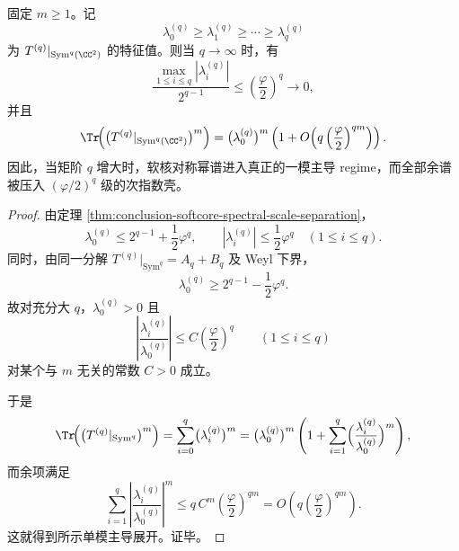 \begin{theorem}[高矩阶软核的单模主导与指数型余谱压缩]\label{thm:conclusion-softcore-highq-one-mode-dominance}
固定 \(m\ge 1\)。记
\[
\lambda_0^{(q)}\ge \lambda_1^{(q)}\ge \cdots \ge \lambda_q^{(q)}
\]
为 \(T^{(q)}|_{\operatorname{Sym}^q(\CC^2)}\) 的特征值。则当 \(q\to\infty\) 时，有
\[
\frac{\max_{1\le i\le q}|\lambda_i^{(q)}|}{2^{q-1}}
\le
\left(\frac{\varphi}{2}\right)^q
\longrightarrow 0,
\]
并且
\[
\Tr\!\Bigl(\bigl(T^{(q)}|_{\operatorname{Sym}^q(\CC^2)}\bigr)^m\Bigr)
=
\bigl(\lambda_0^{(q)}\bigr)^m
\left(
1+O\!\left(q\left(\frac{\varphi}{2}\right)^{qm}\right)
\right).
\]
因此，当矩阶 \(q\) 增大时，软核对称幂谱进入真正的一模主导 regime，而全部余谱被压入 \((\varphi/2)^q\) 级的次指数壳。
\end{theorem}
\begin{proof}
由定理 \ref{thm:conclusion-softcore-spectral-scale-separation}，
\[
\lambda_0^{(q)}\le 2^{q-1}+\frac12\varphi^q,
\qquad
|\lambda_i^{(q)}|\le \frac12\varphi^q\quad(1\le i\le q).
\]
同时，由同一分解 \(T^{(q)}|_{\operatorname{Sym}^q}=A_q+B_q\) 及 Weyl 下界，
\[
\lambda_0^{(q)}\ge 2^{q-1}-\frac12\varphi^q.
\]
故对充分大 \(q\)，\(\lambda_0^{(q)}>0\) 且
\[
\left|\frac{\lambda_i^{(q)}}{\lambda_0^{(q)}}\right|
\le
C\left(\frac{\varphi}{2}\right)^q
\qquad(1\le i\le q)
\]
对某个与 \(m\) 无关的常数 \(C>0\) 成立。

于是
\[
\Tr\!\Bigl(\bigl(T^{(q)}|_{\operatorname{Sym}^q}\bigr)^m\Bigr)
=
\sum_{i=0}^{q}\bigl(\lambda_i^{(q)}\bigr)^m
=
\bigl(\lambda_0^{(q)}\bigr)^m
\left(
1+\sum_{i=1}^{q}\Bigl(\frac{\lambda_i^{(q)}}{\lambda_0^{(q)}}\Bigr)^m
\right),
\]
而余项满足
\[
\sum_{i=1}^{q}\left|\frac{\lambda_i^{(q)}}{\lambda_0^{(q)}}\right|^m
\le
q\,C^m\left(\frac{\varphi}{2}\right)^{qm}
=
O\!\left(q\left(\frac{\varphi}{2}\right)^{qm}\right).
\]
这就得到所示单模主导展开。证毕。
\end{proof}
